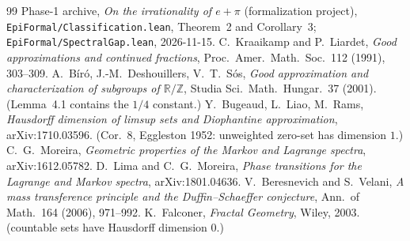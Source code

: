 \documentclass[11pt]{article}
\theoremstyle{definition}
\theoremstyle{remark}
\newcommand{\R}{\mathbb{R}}
\newcommand{\Z}{\mathbb{Z}}
\begin{document}
\begin{thebibliography}{99}
 Phase-1 archive, \emph{On the irrationality of $e+\pi$}
(formalization project), \texttt{EpiFormal/Classification.lean},
Theorem~2 and Corollary~3; \texttt{EpiFormal/SpectralGap.lean}, 2026-11-15.
 C.~Kraaikamp and P.~Liardet, \emph{Good approximations and
continued fractions}, Proc.~Amer.~Math.~Soc.~112 (1991), 303--309.
 A.~B\'ir\'o, J.-M.~Deshouillers, V.~T.~S\'os, \emph{Good
approximation and characterization of subgroups of $\R/\Z$}, Studia Sci.~Math.~Hungar.~37 (2001). (Lemma~4.1 contains the $1/4$ constant.)
 Y.~Bugeaud, L.~Liao, M.~Rams, \emph{Hausdorff dimension of
limsup sets and Diophantine approximation}, arXiv:1710.03596. (Cor.~8,
Eggleston 1952: unweighted zero-set has dimension $1$.)
 C.~G.~Moreira, \emph{Geometric properties of the Markov and
Lagrange spectra}, arXiv:1612.05782.
 D.~Lima and C.~G.~Moreira, \emph{Phase transitions for
the Lagrange and Markov spectra}, arXiv:1801.04636.
 V.~Beresnevich and S.~Velani, \emph{A mass transference principle
and the Duffin--Schaeffer conjecture}, Ann.~of Math.~164 (2006), 971--992.
 K.~Falconer, \emph{Fractal Geometry}, Wiley, 2003.
(countable sets have Hausdorff dimension $0$.)
\end{thebibliography}
\end{document}
